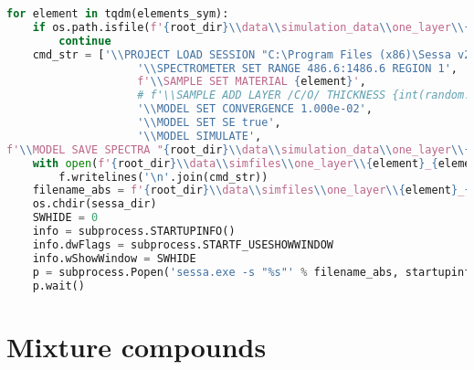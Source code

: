 \begin{lstlisting}[language=Python]
for element in tqdm(elements_sym):
    if os.path.isfile(f'{root_dir}\\data\\simulation_data\\one_layer\\{element}_{element}_spectra.spc'):
        continue
    cmd_str = ['\\PROJECT LOAD SESSION "C:\Program Files (x86)\Sessa v2.2.0\\bin/Sessa_ini.ses"',
                    '\\SPECTROMETER SET RANGE 486.6:1486.6 REGION 1',
                    f'\\SAMPLE SET MATERIAL {element}',
                    # f'\\SAMPLE ADD LAYER /C/O/ THICKNESS {int(random.triangular(12, 24, 15))} ABOVE 0',
                    '\\MODEL SET CONVERGENCE 1.000e-02',
                    '\\MODEL SET SE true',
                    '\\MODEL SIMULATE',
f'\\MODEL SAVE SPECTRA "{root_dir}\\data\\simulation_data\\one_layer\\{element}_{element}_spectra.spc"']
    with open(f'{root_dir}\\data\\simfiles\\one_layer\\{element}_{element}.txt', 'w') as f:
        f.writelines('\n'.join(cmd_str))
    filename_abs = f'{root_dir}\\data\\simfiles\\one_layer\\{element}_{element}.txt'
    os.chdir(sessa_dir)
    SWHIDE = 0
    info = subprocess.STARTUPINFO()
    info.dwFlags = subprocess.STARTF_USESHOWWINDOW
    info.wShowWindow = SWHIDE
    p = subprocess.Popen('sessa.exe -s "%s"' % filename_abs, startupinfo=info)
    p.wait()
\end{lstlisting}

\hypertarget{mixture-compounds}{%
\section*{Mixture compounds}\label{mixture-compounds}}

